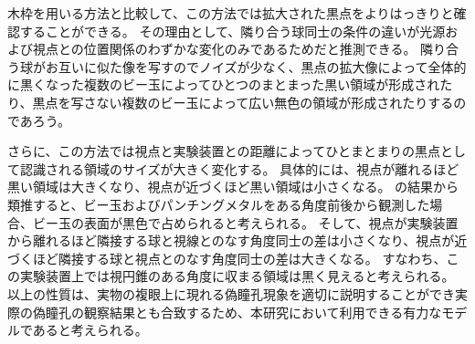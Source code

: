 
木枠を用いる方法と比較して、この方法では拡大された黒点をよりはっきりと確認することができる。
その理由として、隣り合う球同士の条件の違いが光源および視点との位置関係のわずかな変化のみであるためだと推測できる。
隣り合う球がお互いに似た像を写すのでノイズが少なく、黒点の拡大像によって全体的に黒くなった複数のビー玉によってひとつのまとまった黒い領域が形成されたり、黒点を写さない複数のビー玉によって広い無色の領域が形成されたりするのであろう\figref{}。


さらに、この方法では視点と実験装置との距離によってひとまとまりの黒点として認識される領域のサイズが大きく変化する。
具体的には、視点が離れるほど黒い領域は大きくなり、視点が近づくほど黒い領域は小さくなる。
の結果から類推すると、ビー玉およびパンチングメタルをある角度前後から観測した場合、ビー玉の表面が黒色で占められると考えられる。
そして、視点が実験装置から離れるほど隣接する球と視線とのなす角度同士の差は小さくなり、視点が近づくほど隣接する球と視点とのなす角度同士の差は大きくなる\figref{}。
すなわち、この実験装置上では視円錐のある角度に収まる領域は黒く見えると考えられる\figref{}。
以上の性質は、実物の複眼上に現れる偽瞳孔現象を適切に説明することができ実際の偽瞳孔の観察結果とも合致するため、本研究において利用できる有力なモデルであると考えられる。

